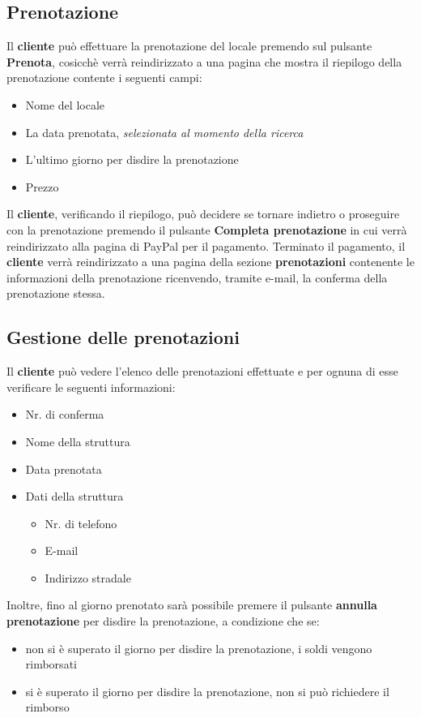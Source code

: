 \subsection{Prenotazione}
Il \textbf{cliente} può effettuare la prenotazione del locale premendo sul pulsante \textbf{Prenota}, cosicchè verrà 
reindirizzato a una pagina che mostra il riepilogo della prenotazione contente i seguenti campi:
\begin{itemize}
    \item Nome del locale
    \item La data prenotata, \emph{selezionata al momento della ricerca}
    \item L'ultimo giorno per disdire la prenotazione
    \item Prezzo
    \label{itm:recapPrenotazione}
\end{itemize}
Il \textbf{cliente}, verificando il riepilogo, può decidere se tornare indietro o proseguire con la prenotazione
premendo il pulsante \textbf{Completa prenotazione} in cui verrà reindirizzato alla pagina di PayPal per il pagamento. 
Terminato il pagamento, il \textbf{cliente} verrà reindirizzato a una pagina della sezione \textbf{prenotazioni}
contenente le informazioni della prenotazione ricenvendo, tramite e-mail, la conferma della prenotazione stessa.

\subsection{Gestione delle prenotazioni}
Il \textbf{cliente} può vedere l'elenco delle prenotazioni effettuate e per ognuna di esse verificare le seguenti 
informazioni:
\begin{itemize}
    \item Nr. di conferma
    \item Nome della struttura
    \item Data prenotata
    \item Dati della struttura \begin{itemize}
        \item Nr. di telefono
        \item E-mail
        \item Indirizzo stradale
    \end{itemize}
    \label{itm:prenotazione}
\end{itemize}
Inoltre, fino al giorno prenotato sarà possibile premere il pulsante \textbf{annulla prenotazione} per disdire la
prenotazione, a condizione che se:
\begin{itemize}
    \item non si è superato il giorno per disdire la prenotazione, i soldi vengono rimborsati
    \item si è superato il giorno per disdire la prenotazione, non si può richiedere il rimborso
    \label{itm:cancPren}
\end{itemize}


